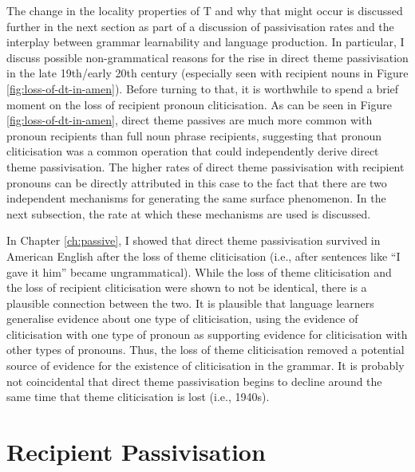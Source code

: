 	The change in the locality properties of T and why that might occur is discussed further in the next section as part of a discussion of passivisation rates and the interplay between grammar learnability and language production. In particular, I discuss possible non-grammatical reasons for the rise in direct theme passivisation in the late 19th/early 20th century (especially seen with recipient nouns in Figure \ref{fig:loss-of-dt-in-amen}). Before turning to that, it is worthwhile to spend a brief moment on the loss of recipient pronoun cliticisation. As can be seen in Figure \ref{fig:loss-of-dt-in-amen}, direct theme passives are much more common with pronoun recipients than full noun phrase recipients, suggesting that pronoun cliticisation was a common operation that could independently derive direct theme passivisation. The higher rates of direct theme passivisation with recipient pronouns can be directly attributed in this case to the fact that there are two independent mechanisms for generating the same surface phenomenon. In the next subsection, the rate at which these mechanisms are used is discussed.
	
	In Chapter \ref{ch:passive}, I showed that direct theme passivisation survived in American English after the loss of theme cliticisation (i.e., after sentences like ``I gave it him'' became ungrammatical). While the loss of theme cliticisation and the loss of recipient cliticisation were shown to not be identical, there is a plausible connection between the two. It is plausible that language learners generalise evidence about one type of cliticisation, using the evidence of cliticisation with one type of pronoun as supporting evidence for cliticisation with other types of pronouns. Thus, the loss of theme cliticisation removed a potential source of evidence for the existence of cliticisation in the grammar. It is probably not coincidental that direct theme passivisation begins to decline around the same time that theme cliticisation is lost (i.e., 1940s).

	\section{Recipient Passivisation}\label{sec:en-pas}

